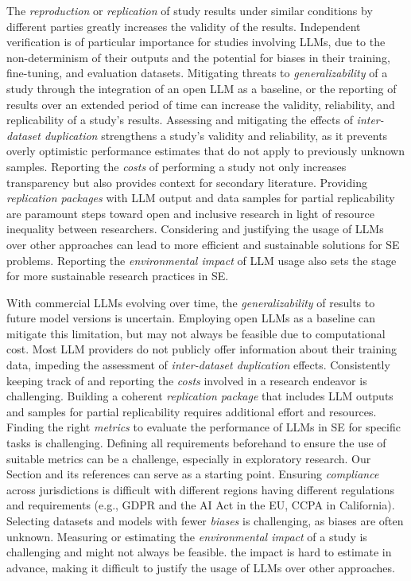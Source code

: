 The \emph{reproduction} or \emph{replication} of study results under similar conditions by different parties greatly increases the validity of the results. %
Independent verification is of particular importance for studies involving LLMs, due to the non-determinism of their outputs and the potential for biases in their training, fine-tuning, and evaluation datasets.
Mitigating threats to \emph{generalizability} of a study through the integration of an open LLM as a baseline, or the reporting of results over an extended period of time can increase the validity, reliability, and replicability of a study's results.
Assessing and mitigating the effects of \emph{inter-dataset duplication} strengthens a study's validity and reliability, as it prevents overly optimistic performance estimates that do not apply to previously unknown samples.
Reporting the \emph{costs} of performing a study not only increases transparency but also provides context for secondary literature. %
Providing \emph{replication packages} with LLM output and data samples for partial replicability are paramount steps toward open and inclusive research in light of resource inequality between researchers.
Considering and justifying the usage of LLMs over other approaches can lead to more efficient and sustainable solutions for SE problems. 
Reporting the \emph{environmental impact} of LLM usage also sets the stage for more sustainable research practices in SE.


With commercial LLMs evolving over time, the \emph{generalizability} of results to future model versions is uncertain.
Employing open LLMs as a baseline can mitigate this limitation, but may not always be feasible due to computational cost.
Most LLM providers do not publicly offer information about their training data, impeding the assessment of \emph{inter-dataset duplication} effects.
Consistently keeping track of and reporting the \emph{costs} involved in a research endeavor is challenging.
Building a coherent \emph{replication package} that includes LLM outputs and samples for partial replicability requires additional effort and resources.
Finding the right \emph{metrics} to evaluate the performance of LLMs in SE for specific tasks is challenging.
Defining all requirements beforehand to ensure the use of suitable metrics can be a challenge, especially in exploratory research.
Our Section \benchmarksmetrics and its references can serve as a starting point.
Ensuring \emph{compliance} across jurisdictions is difficult with different regions having different regulations and requirements (e.g., GDPR and the AI Act in the EU, CCPA in California).
Selecting datasets and models with fewer \emph{biases} is challenging, as biases are often unknown.
Measuring or estimating the \emph{environmental impact} of a study is challenging and might not always be feasible.
  the impact is hard to estimate in advance, making it difficult to justify the usage of LLMs over other approaches.

